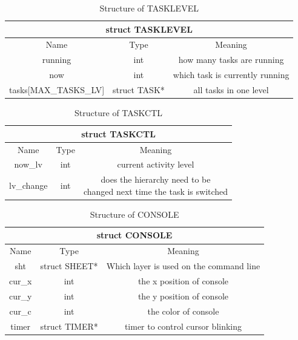 \documentclass{swfcthesis}
\begin{document}
\begin{table}[!htbp]
  \centering
  \begin{tabular}{|c|c|c|}
    \hline
    \multicolumn{3}{|c|}{struct TASKLEVEL} \\
    \hline
    Name & Type & Meaning \\
    \hline
    running & int & how many tasks are running \\
    \hline
    now & int & which task is currently running \\
    \hline
    tasks[MAX\_TASKS\_LV] & struct TASK* & all tasks in one level \\
    \hline
  \end{tabular}
  \caption{Structure of TASKLEVEL}
  \label{tab:TASKLEVEL}
\end{table}

\begin{table}[!htbp]
  \centering
  \begin{tabular}{|c|c|c|}
    \hline
    \multicolumn{3}{|c|}{struct TASKCTL} \\
    \hline
    Name & Type & Meaning \\
    \hline
    now\_lv & int & current activity level \\
    \hline
    lv\_change & int & \makecell{does the hierarchy need to be \\ changed next time the task is
                       switched} \\
    \hline
  \end{tabular}
  \caption{Structure of TASKCTL}
  \label{tab:TASKCTL}
\end{table}

\begin{table}[!htbp]
  \centering
  \begin{tabular}{|c|c|c|}
    \hline
    \multicolumn{3}{|c|}{struct CONSOLE} \\
    \hline
    Name & Type & Meaning \\
    \hline
    sht & struct SHEET* & Which layer is used on the command line \\
    \hline
    cur\_x & int & the x position of console \\
    \hline
    cur\_y & int & the y position of console \\
    \hline
    cur\_c & int & the color of console \\
    \hline
    timer & struct TIMER* & timer to control cursor blinking \\
    \hline
  \end{tabular}
  \caption{Structure of CONSOLE}
  \label{tab:CONSOLE}
\end{table}
\end{document}
